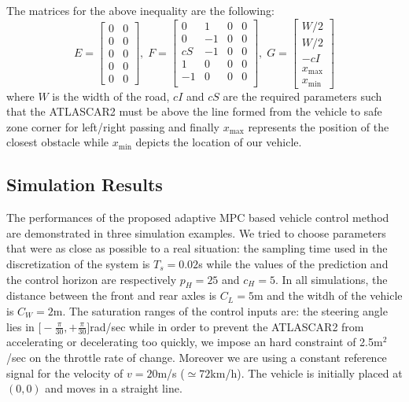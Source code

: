 \documentclass[conference, 11pt]{IEEEtran}
\begin{document}
The matrices for the above inequality are the following:
\[
E= 
\begin{bmatrix}
0&0\\
0&0\\
0&0\\
0&0\\
0&0
\end{bmatrix},
\;
F=\begin{bmatrix}
0&1&0&0\\
0&-1&0&0\\
cS&-1&0&0\\
1&0&0&0\\
-1&0&0&0\\
\end{bmatrix},\;
G=
\begin{bmatrix}
W/2\\W/2\\-cI\\x_{\max}\\x_{\min}
\end{bmatrix}
\]
where $W$ is the width of the road, $cI$ and $cS$ are the required parameters such that the ATLASCAR2 must be above the line formed from the vehicle to safe zone corner for left/right passing and finally $x_{\max}$ represents the position of the closest obstacle while $x_{\min}$ depicts the location of our vehicle. 
\subsection{Simulation Results}
The performances of the proposed adaptive MPC based vehicle control method are demonstrated in three
simulation examples. We tried to choose parameters that were as close as possible to a real situation: the sampling time used in the discretization of the system is $T_s= 0.02$s while the values of the prediction and the control horizon are respectively $p_H=25$ and $c_H=5$. In all simulations, the distance between the front and rear axles is $C_L=5$m and the witdh of the vehicle is $C_W=2$m. The saturation ranges of the control inputs are: the steering angle lies in $\big[-\frac{\pi}{30}, +\frac{\pi}{30}\big]$rad/sec while in order to prevent the ATLASCAR2 from accelerating or decelerating too quickly, we impose an hard constraint of 2.5m$^2$/sec on the throttle rate of change. Moreover we are using a constant reference signal for the velocity of $v=20$m/s ($\simeq72$km/h).
The vehicle is initially placed at $(0,0)$ and moves in a s­traight line.
\end{document}
